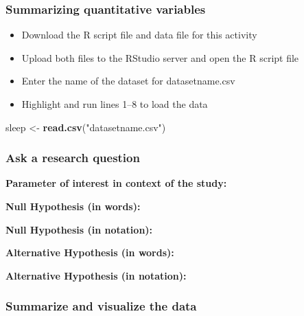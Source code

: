 \documentclass[
]{report}
\newenvironment{Shaded}{\begin{snugshade}}{\end{snugshade}}
\newcommand{\FunctionTok}[1]{\textcolor[rgb]{0.13,0.29,0.53}{\textbf{#1}}}
\newcommand{\NormalTok}[1]{#1}
\newcommand{\OtherTok}[1]{\textcolor[rgb]{0.56,0.35,0.01}{#1}}
\newcommand{\StringTok}[1]{\textcolor[rgb]{0.31,0.60,0.02}{#1}}
\begin{document}
\subsubsection*{Summarizing quantitative variables}\label{summarizing-quantitative-variables-1}

\begin{itemize}
\item
  Download the R script file and data file for this activity
\item
  Upload both files to the RStudio server and open the R script file
\item
  Enter the name of the dataset for datasetname.csv
\item
  Highlight and run lines 1--8 to load the data
\end{itemize}

\begin{Shaded}
\begin{Highlighting}[]
\NormalTok{sleep }\OtherTok{\textless{}{-}} \FunctionTok{read.csv}\NormalTok{(}\StringTok{"datasetname.csv"}\NormalTok{)}
\end{Highlighting}
\end{Shaded}

\subsubsection*{Ask a research question}\label{ask-a-research-question-1}

\textbf{Parameter of interest in context of the study:}

\vspace{1in}

\textbf{Null Hypothesis (in words):}

\vspace{1in}

\textbf{Null Hypothesis (in notation):}

\vspace{0.3in}

\textbf{Alternative Hypothesis (in words):}

\vspace{1in}

\textbf{Alternative Hypothesis (in notation):}

\vspace{0.3in}

\subsubsection*{Summarize and visualize the data}\label{summarize-and-visualize-the-data-1}
\end{document}
